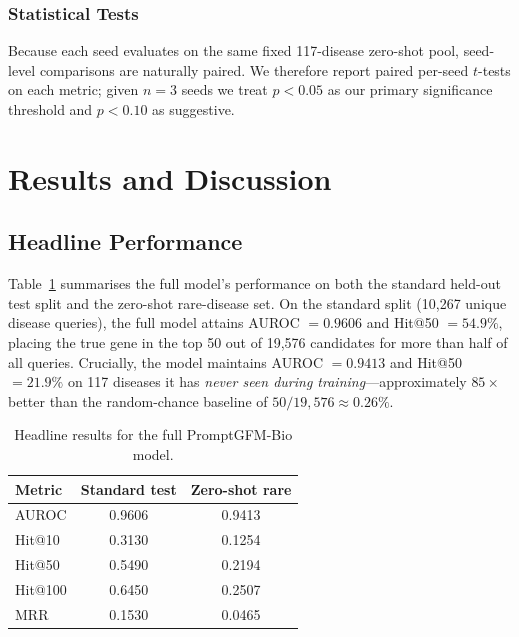 \documentclass[conference]{IEEEtran}
\begin{document}
\subsubsection{Statistical Tests}
Because each seed evaluates on the same fixed 117-disease zero-shot pool, seed-level comparisons are naturally paired. We therefore report paired per-seed $t$-tests on each metric; given $n=3$ seeds we treat $p<0.05$ as our primary significance threshold and $p<0.10$ as suggestive.

\section{Results and Discussion}
\label{sec:results}

\subsection{Headline Performance}
Table~\ref{tab:headline} summarises the full model's performance on both the standard held-out test split and the zero-shot rare-disease set. On the standard split (10{,}267 unique disease queries), the full model attains AUROC $= 0.9606$ and Hit@50 $= 54.9\%$, placing the true gene in the top 50 out of 19{,}576 candidates for more than half of all queries. Crucially, the model maintains AUROC $= 0.9413$ and Hit@50 $= 21.9\%$ on 117 diseases it has \emph{never seen during training}---approximately $85\times$ better than the random-chance baseline of $50/19{,}576 \approx 0.26\%$.

\begin{table}[t]
\centering
\caption{Headline results for the full PromptGFM-Bio model.}
\label{tab:headline}
\begin{tabular}{@{}lcc@{}}
\toprule
\textbf{Metric} & \textbf{Standard test} & \textbf{Zero-shot rare} \\
\midrule
AUROC & 0.9606 & 0.9413 \\
Hit@10 & 0.3130 & 0.1254 \\
Hit@50 & 0.5490 & 0.2194 \\
Hit@100 & 0.6450 & 0.2507 \\
MRR & 0.1530 & 0.0465 \\
\bottomrule
\end{tabular}
\end{table}
\end{document}
